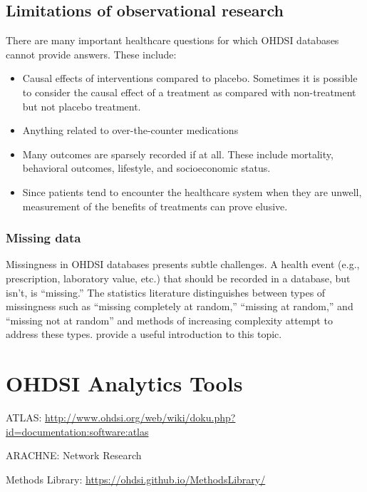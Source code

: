 \documentclass[]{book}
\providecommand{\tightlist}{%
  \setlength{\itemsep}{0pt}\setlength{\parskip}{0pt}}
\begin{document}
\section{Limitations of observational
research}\label{limitations-of-observational-research}

There are many important healthcare questions for which OHDSI databases
cannot provide answers. These include:

\begin{itemize}
\tightlist
\item
  Causal effects of interventions compared to placebo. Sometimes it is
  possible to consider the causal effect of a treatment as compared with
  non-treatment but not placebo treatment.
\item
  Anything related to over-the-counter medications
\item
  Many outcomes are sparsely recorded if at all. These include
  mortality, behavioral outcomes, lifestyle, and socioeconomic status.
\item
  Since patients tend to encounter the healthcare system when they are
  unwell, measurement of the benefits of treatments can prove elusive.
\end{itemize}

\subsection{Missing data}\label{missing-data}

Missingness in OHDSI databases presents subtle challenges. A health
event (e.g., prescription, laboratory value, etc.) that should be
recorded in a database, but isn't, is ``missing.'' The statistics
literature distinguishes between types of missingness such as ``missing
completely at random,'' ``missing at random,'' and ``missing not at
random'' and methods of increasing complexity attempt to address these
types. \citet{perkins2017principled} provide a useful introduction to
this topic.

\chapter{OHDSI Analytics Tools}\label{OhdsiAnalyticsTools}

ATLAS:
\url{http://www.ohdsi.org/web/wiki/doku.php?id=documentation:software:atlas}

ARACHNE: Network Research

Methods Library: \url{https://ohdsi.github.io/MethodsLibrary/}
\end{document}
